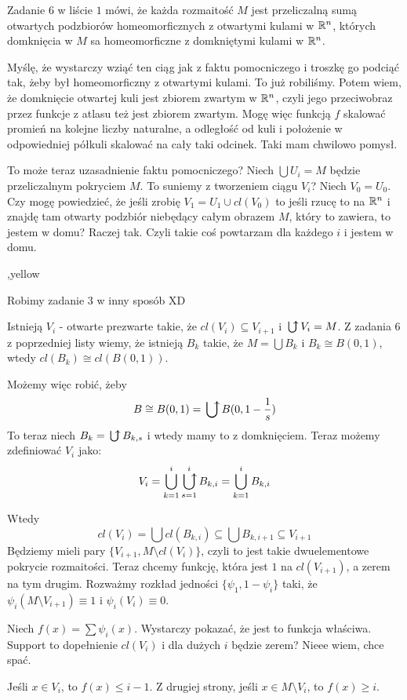 \documentclass{article}
\begin{document}
Zadanie $6$ w liście $1$ mówi, że każda rozmaitość $M$ jest przeliczalną sumą otwartych podzbiorów homeomorficznych z otwartymi kulami w $\mathbb{R}^n$, których domknięcia w $M$ sa homeomorficzne z domkniętymi kulami w $\mathbb{R}^n$.

Myślę, że wystarczy wziąć ten ciąg jak z faktu pomocniczego i troszkę go podciąć tak, żeby był homeomorficzny z otwartymi kulami. To już robiliśmy. Potem wiem, że domknięcie otwartej kuli jest zbiorem zwartym w $\mathbb{R}^n$, czyli jego przeciwobraz przez funkcje z atlasu też jest zbiorem zwartym. Mogę więc funkcją $f$ skalować promień na kolejne liczby naturalne, a odległość od kuli i położenie w odpowiedniej półkuli skalować na cały taki odcinek. Taki mam chwilowo pomysł.

To może teraz uzasadnienie faktu pomocniczego?
Niech $\bigcup U_i=M$ będzie przeliczalnym pokryciem $M$.
To suniemy z tworzeniem ciągu $V_i$? Niech $V_0=U_0$. Czy mogę powiedzieć, że jeśli zrobię $V_1=U_1\cup cl(V_0)$ to jeśli rzucę to na $\mathbb{R}^n$ i znajdę tam otwarty podzbiór niebędący całym obrazem $M$, który to zawiera, to jestem w domu? Raczej tak. Czyli takie coś powtarzam dla każdego $i$ i jestem w domu.

\sep{yellow}

Robimy zadanie 3 w inny sposób XD

Istnieją $V_i$ - otwarte prezwarte takie, że $cl(V_i)\subseteq V_{i+1}$ i $\abigcup V_i=M$. Z zadania 6 z poprzedniej listy wiemy, że istnieją $B_k$ takie, że $M=\bigcup B_k$ i $B_k\cong B(0,1)$, wtedy $cl(B_k)\cong cl(B(0,1))$. 

Możemy więc robić, żeby
$$B\cong B(0,1)=\abigcup B(0,1-\frac1{s})$$
To teraz niech $B_k=\abigcup B_{k,s}$ i wtedy mamy to z domknięciem. Teraz możemy zdefiniować $V_i$ jako:
$$V_i=\bigcup\limits_{k=1}^i\abigcup\limits_{s=1}^iB_{k,i}=\bigcup\limits_{k=1}^iB_{k,i}$$

Wtedy 
$$cl(V_i)=\bigcup cl(B_{k,i})\subseteq \bigcup B_{k,i+1}\subseteq V_{i+1}$$
Będziemy mieli pary $\{V_{i+1},M\setminus cl(V_i)\}$, czyli to jest takie dwuelementowe pokrycie rozmaitości. Teraz chcemy funkcję, która jest $1$ na $cl(V_{i+1})$, a zerem na tym drugim. Rozważmy rozkład jedności $\{\psi_1,1-\psi_i\}$ taki, że $\psi_i(M\setminus V_{i+1})\equiv 1$ i $\psi_i(V_i)\equiv 0$.

Niech $f(x)=\sum\psi_i(x)$. Wystarczy pokazać, że jest to funkcja właściwa. Support to dopełnienie $cl(V_i)$ i dla dużych $i$ będzie zerem? Nieee wiem, chce spać.

Jeśli $x\in V_i$, to $f(x)\leq i-1$. Z drugiej strony, jeśli $x\in M\setminus V_i$, to $f(x)\geq i$.
\end{document}
